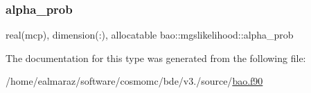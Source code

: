 \subsubsection{\texorpdfstring{alpha\+\_\+prob}{alpha\_prob}}
{\footnotesize\ttfamily real(mcp), dimension(\+:), allocatable bao\+::mgslikelihood\+::alpha\+\_\+prob\hspace{0.3cm}{\ttfamily [private]}}



The documentation for this type was generated from the following file\+:\begin{DoxyCompactItemize}
\item 
/home/ealmaraz/software/cosmomc/bde/v3./source/\mbox{\hyperlink{bao_8f90}{bao.\+f90}}\end{DoxyCompactItemize}
